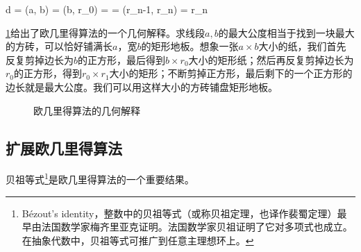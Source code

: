 \documentclass[b5paper]{ctexart}
\begin{document}
\be
d = (a, b) = (b, r_0) = \dotso = (r_{n-1}, r_n) = r_n
\label{eq:recursive-gcm}
\ee

\cref{fig:geometric-GCM}给出了欧几里得算法的一个几何解释。求线段$a, b$的最大公度相当于找到一块最大的方砖，可以恰好铺满长$a$，宽$b$的矩形地板。想象一张$a \times b$大小的纸，我们首先反复剪掉边长为$b$的正方形，最后得到$b \times r_0$大小的矩形纸；然后再反复剪掉边长为$r_0$的正方形，得到$r_0 \times r_1$大小的矩形；不断剪掉正方形，最后剩下的一个正方形的边长就是最大公度。我们可以用这样大小的方砖铺盘矩形地板。

\begin{figure}[htbp]
 \centering
 \caption{欧几里得算法的几何解释}
 \label{fig:geometric-GCM}
\end{figure}

\subsection{扩展欧几里得算法}
 

贝祖等式\footnote{Bézout's identity，整数中的贝祖等式（或称贝祖定理，也译作裴蜀定理）最早由法国数学家梅齐里亚克证明。法国数学家贝祖证明了它对多项式也成立。在抽象代数中，贝祖等式可推广到任意主理想环上。}是欧几里得算法的一个重要结果。
\end{document}
